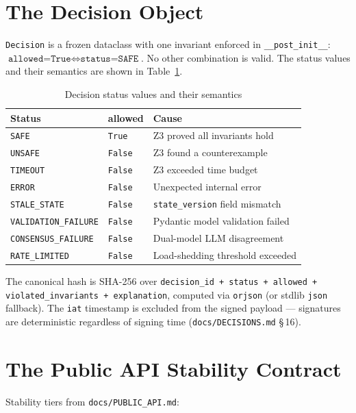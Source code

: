 \documentclass[12pt,a4paper,oneside]{report}
\newcommand{\fname}[1]{\texttt{#1}}          %
\newcommand{\code}[1]{\texttt{#1}}           %
\newcommand{\cfrsec}[1]{\S\,#1}             %
\begin{document}
\section{The Decision Object}

\code{Decision} is a frozen dataclass with one invariant enforced in
\code{\_\_post\_init\_\_}: $\code{allowed=True} \Leftrightarrow
\code{status=SAFE}$. No other combination is valid. The status values and
their semantics are shown in Table~\ref{tab:decision-status}.

\begin{table}[h]
\centering\small
\begin{tabular}{@{}l l p{7.5cm}@{}}
\toprule
\textbf{Status} & \textbf{allowed} & \textbf{Cause} \\
\midrule
\code{SAFE}                & \code{True}  & Z3 proved all invariants hold \\
\code{UNSAFE}              & \code{False} & Z3 found a counterexample \\
\code{TIMEOUT}             & \code{False} & Z3 exceeded time budget \\
\code{ERROR}               & \code{False} & Unexpected internal error \\
\code{STALE\_STATE}        & \code{False} & \code{state\_version} field mismatch \\
\code{VALIDATION\_FAILURE} & \code{False} & Pydantic model validation failed \\
\code{CONSENSUS\_FAILURE}  & \code{False} & Dual-model LLM disagreement \\
\code{RATE\_LIMITED}       & \code{False} & Load-shedding threshold exceeded \\
\bottomrule
\end{tabular}
\caption{Decision status values and their semantics}
\label{tab:decision-status}
\end{table}

The canonical hash is SHA-256 over \code{decision\_id + status + allowed +
violated\_invariants + explanation}, computed via \code{orjson} (or stdlib
\code{json} fallback). The \code{iat} timestamp is excluded from the signed
payload --- signatures are deterministic regardless of signing time
(\fname{docs/DECISIONS.md} \cfrsec{16}).

\section{The Public API Stability Contract}

Stability tiers from \fname{docs/PUBLIC\_API.md}:
\end{document}
